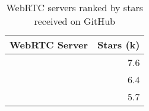 \begin{table}[ht]
\centering
\caption{WebRTC servers ranked by stars received on GitHub}
\label{tab:githubStarsRankingWebRTC}
\begin{tabular}[t]{|l|r|}
\toprule
WebRTC Server & Stars (k)\\
\midrule
\cite{githubJanus} & 7.6\\
\cite{githubLiveKit} & 6.4\\
\cite{githubMediasoup} & 5.7\\
\bottomrule
\end{tabular}
\end{table}
